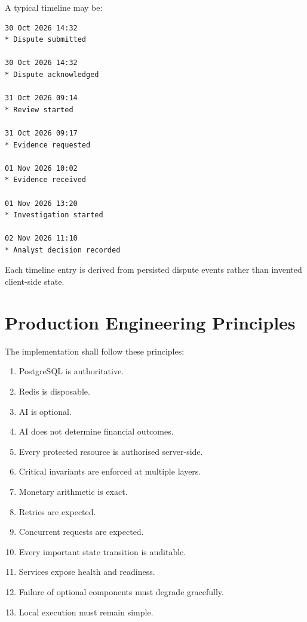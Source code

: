 \documentclass[11pt,a4paper]{article}
\begin{document}
A typical timeline may be:

\begin{lstlisting}
30 Oct 2026 14:32
* Dispute submitted

30 Oct 2026 14:32
* Dispute acknowledged

31 Oct 2026 09:14
* Review started

31 Oct 2026 09:17
* Evidence requested

01 Nov 2026 10:02
* Evidence received

01 Nov 2026 13:20
* Investigation started

02 Nov 2026 11:10
* Analyst decision recorded
\end{lstlisting}

Each timeline entry is derived from persisted dispute events rather than
invented client-side state.

\section{Production Engineering Principles}

The implementation shall follow these principles:

\begin{enumerate}
    \item PostgreSQL is authoritative.
    \item Redis is disposable.
    \item AI is optional.
    \item AI does not determine financial outcomes.
    \item Every protected resource is authorised server-side.
    \item Critical invariants are enforced at multiple layers.
    \item Monetary arithmetic is exact.
    \item Retries are expected.
    \item Concurrent requests are expected.
    \item Every important state transition is auditable.
    \item Services expose health and readiness.
    \item Failure of optional components must degrade gracefully.
    \item Local execution must remain simple.
\end{enumerate}
\end{document}
